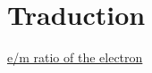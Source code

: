 \documentclass[../main.tex]{subfiles}
\begin{document}
\section{Traduction}

\href{https://physicsx.erau.edu/HelmholtzCoils/Lab_MP_1.pdf}{e/m ratio of the electron}
    
    
\end{document}
